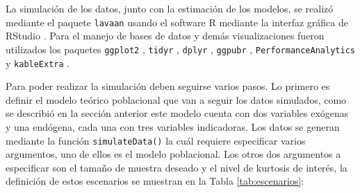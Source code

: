 \documentclass[english]{revcoles}
\begin{document}
La simulación de los datos, junto con la estimación de los modelos, se realizó mediante el paquete \texttt{lavaan} \cite{lavaan} usando el software R \cite{R} mediante la interfaz gráfica de RStudio \cite{RStudio}. Para el manejo de bases de datos y demás visualizaciones fueron utilizados los paquetes \texttt{ggplot2} \cite{ggplot2}, \texttt{tidyr} \cite{tidyr}, \texttt{dplyr} \cite{dplyr}, \texttt{ggpubr} \cite{ggpubr}, \texttt{PerformanceAnalytics} \cite{PerformanceAnalytics} y \texttt{kableExtra} \cite{kableExtra}.

Para poder realizar la simulación deben seguirse varios pasos. Lo primero es definir el modelo teórico poblacional que van a seguir los datos simulados, como se describió en la sección anterior este modelo cuenta con dos variables exógenas y una endógena, cada una con tres variables indicadoras. Los datos se generan mediante la función \texttt{simulateData()} la cuál requiere especificar varios argumentos, uno de ellos es el modelo poblacional. Los otros dos argumentos a especificar son el tamaño de muestra deseado y el nivel de kurtosis de interés, la definición de estos escenarios se muestran en la Tabla \ref{tab:escenarios}:

\begin{table}[!h]
  \caption{\label{tab:unnamed-chunk-6}\label{tab:escenarios}Escenarios de simulación}
  \centering
\end{table}
\end{document}
